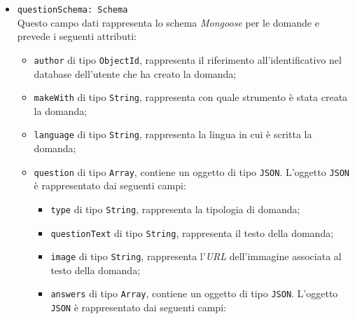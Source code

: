 \begin{itemize}
\begin{itemize}
		\item \texttt{questionSchema: Schema} \\
		Questo campo dati rappresenta lo schema \textit{Mongoose} per le domande e prevede i seguenti attributi:
		\begin{itemize}
			\item \texttt{author} di tipo \texttt{ObjectId}, rappresenta il riferimento all'identificativo nel database dell'utente che ha creato la domanda;
			\item \texttt{makeWith} di tipo \texttt{String}, rappresenta con quale strumento è stata creata la domanda;
			\item \texttt{language} di tipo \texttt{String}, rappresenta la lingua in cui è scritta la domanda; 
			\item \texttt{question} di tipo \texttt{Array}, contiene un oggetto di tipo \texttt{JSON}. L'oggetto \texttt{JSON} è rappresentato dai seguenti campi:
				\begin{itemize}
					\item \texttt{type} di tipo \texttt{String}, rappresenta la tipologia di domanda; 
					\item \texttt{questionText} di tipo \texttt{String}, rappresenta il testo della domanda; 
					\item \texttt{image} di tipo \texttt{String}, rappresenta l'\textit{URL} dell'immagine associata al testo della domanda; 
					\item \texttt{answers} di tipo \texttt{Array}, contiene un oggetto di tipo \texttt{JSON}. L'oggetto \texttt{JSON} è rappresentato dai seguenti campi:
					\begin{enumerate}	
										  

\end{enumerate}
\end{itemize}
\end{itemize}
\end{itemize}
\end{itemize}
